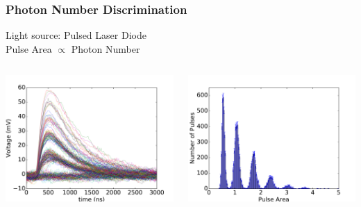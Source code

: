 \begin{frame}\frametitle{Photon Number Discrimination}
  \begin{center}
  Light source: Pulsed Laser Diode\\
  Pulse Area $\propto$ Photon Number
  \begin{columns}
        \begin{center}
          \includegraphics[width=1\textwidth]{images/persistence_plot/persistence.pdf}
        \end{center}
        \begin{center}
          \includegraphics[width=1\textwidth]{images/area_histogram_single_diode_pulse/area_histo.pdf}
        \end{center}
    \end{columns}
  \end{center}
\end{frame}